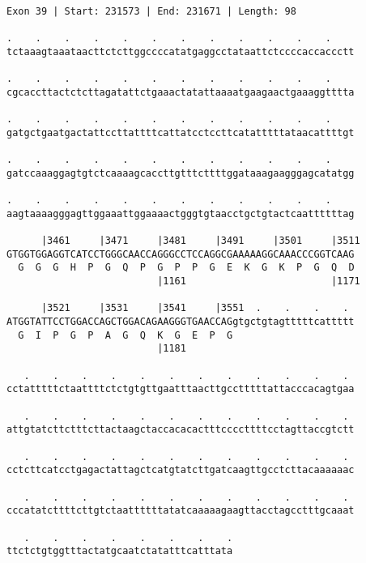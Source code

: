 \documentclass{article}
\begin{document}
\begin{Verbatim}[fontfamily=courier]
Exon 39 | Start: 231573 | End: 231671 | Length: 98

.    .    .    .    .    .    .    .    .    .    .    .    
tctaaagtaaataacttctcttggccccatatgaggcctataattctccccaccaccctt

.    .    .    .    .    .    .    .    .    .    .    .    
cgcaccttactctcttagatattctgaaactatattaaaatgaagaactgaaaggtttta

.    .    .    .    .    .    .    .    .    .    .    .    
gatgctgaatgactattccttattttcattatcctccttcatatttttataacattttgt

.    .    .    .    .    .    .    .    .    .    .    .    
gatccaaaggagtgtctcaaaagcaccttgtttcttttggataaagaagggagcatatgg

.    .    .    .    .    .    .    .    .    .    .    .    
aagtaaaagggagttggaaattggaaaactgggtgtaacctgctgtactcaattttttag

      |3461     |3471     |3481     |3491     |3501     |3511
GTGGTGGAGGTCATCCTGGGCAACCAGGGCCTCCAGGCGAAAAAGGCAAACCCGGTCAAG
  G  G  G  H  P  G  Q  P  G  P  P  G  E  K  G  K  P  G  Q  D
                          |1161                         |1171

      |3521     |3531     |3541     |3551  .    .    .    . 
ATGGTATTCCTGGACCAGCTGGACAGAAGGGTGAACCAGgtgctgtagtttttcattttt
  G  I  P  G  P  A  G  Q  K  G  E  P  G                     
                          |1181                             

   .    .    .    .    .    .    .    .    .    .    .    . 
cctatttttctaattttctctgtgttgaatttaacttgcctttttattacccacagtgaa

   .    .    .    .    .    .    .    .    .    .    .    . 
attgtatcttctttcttactaagctaccacacactttccccttttcctagttaccgtctt

   .    .    .    .    .    .    .    .    .    .    .    . 
cctcttcatcctgagactattagctcatgtatcttgatcaagttgcctcttacaaaaaac

   .    .    .    .    .    .    .    .    .    .    .    . 
cccatatcttttcttgtctaattttttatatcaaaaagaagttacctagcctttgcaaat

   .    .    .    .    .    .    .    .
ttctctgtggtttactatgcaatctatatttcatttata
\end{Verbatim}
\newpage
\end{document}
